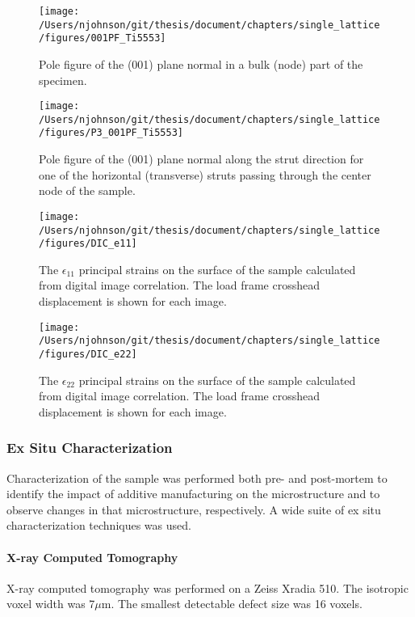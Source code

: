 \begin{figure}
		\texttt{[image: /Users/njohnson/git/thesis/document/chapters/single\_lattice/figures/001PF\_Ti5553]}
		\caption{Pole figure of the (001) plane normal in a bulk (node) part of the specimen.}
		\label{P3}
\end{figure}
\begin{figure}
		\texttt{[image: /Users/njohnson/git/thesis/document/chapters/single\_lattice/figures/P3\_001PF\_Ti5553]}
		\caption{Pole figure of the (001) plane normal along the strut direction for one of the horizontal (transverse) struts passing through the center node of the sample.}
		\label{strut}
	\label{texture}
\end{figure}



\begin{figure*}
	\texttt{[image: /Users/njohnson/git/thesis/document/chapters/single\_lattice/figures/DIC\_e11]}
	\caption{The $\epsilon_{11}$ principal strains on the surface of the sample calculated from digital image correlation. The load frame crosshead displacement is shown for each image.}
	\label{e11}
\end{figure*}
\begin{figure*}
	\texttt{[image: /Users/njohnson/git/thesis/document/chapters/single\_lattice/figures/DIC\_e22]}
	\caption{The $\epsilon_{22}$ principal strains on the surface of the sample calculated from digital image correlation. The load frame crosshead displacement is shown for each image.}
	\label{e22}
\end{figure*}

\subsubsection{Ex Situ Characterization}
Characterization of the sample was performed both pre- and post-mortem to identify the impact of additive manufacturing on the microstructure and to observe changes in that microstructure, respectively. A wide suite of ex situ characterization techniques was used.


\paragraph{X-ray Computed Tomography}


X-ray computed tomography was performed on a Zeiss Xradia 510. The isotropic voxel width was 7$\mu$m. The smallest detectable defect size was 16 voxels.

